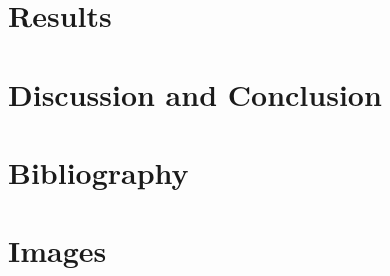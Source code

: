 \documentclass[journal]{IEEEtran}
\begin{document}


\section{Results}



\section{Discussion and Conclusion}



\section{Bibliography}



\section{Images}


\end{document}
